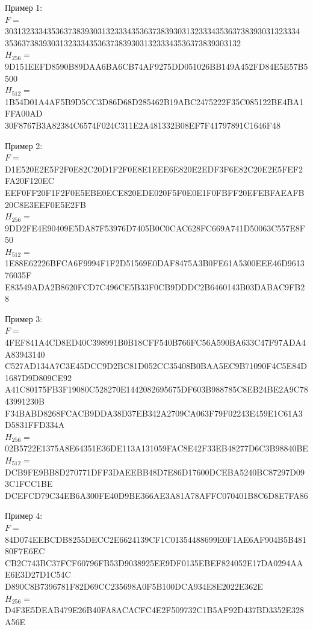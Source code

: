 {\ttfamily
\par
Пример 1:\\
$F=\;$3031323334353637383930313233343536373839303132333435363738393031323334\\35363738393031323334353637383930313233343536373839303132\\
$H_{256}=\;$9D151EEFD8590B89DAA6BA6CB74AF9275DD051026BB149A452FD84E5E57B5500\\
$H_{512}=\;$1B54D01A4AF5B9D5CC3D86D68D285462B19ABC2475222F35C085122BE4BA1FFA00AD\\30F8767B3A82384C6574F024C311E2A481332B08EF7F41797891C1646F48
\par
Пример 2:\\
$F=\;$D1E520E2E5F2F0E82C20D1F2F0E8E1EEE6E820E2EDF3F6E82C20E2E5FEF2FA20F120EC\\EEF0FF20F1F2F0E5EBE0ECE820EDE020F5F0E0E1F0FBFF20EFEBFAEAFB20C8E3EEF0E5E2FB\\
$H_{256}=\;$9DD2FE4E90409E5DA87F53976D7405B0C0CAC628FC669A741D50063C557E8F50\\
$H_{512}=\;$1E88E62226BFCA6F9994F1F2D51569E0DAF8475A3B0FE61A5300EEE46D961376035F\\E83549ADA2B8620FCD7C496CE5B33F0CB9DDDC2B6460143B03DABAC9FB28
\par
Пример 3:\\
$F=\;$4FEF841A4CD8ED40C398991B0B18CFF540B766FC56A590BA633C47F97ADA4A83943140\\C527AD134A7C3E45DCC9D2BC81D052CC35408B0BAA5EC9B71090F4C5E84D1687D9D809CE92\\A41C80175FB3F19080C528270E1442082695675DF603B988785C8EB24BE2A9C7843991230B\\F34BABD8268FCACB9DDA38D37EB342A2709CA063F79F02243E459E1C61A3D5831FFD334A\\
$H_{256}=\;$02B5722E1375A8E64351E36DE113A131059FAC8E42F33EB48277D6C3B98840BE\\
$H_{512}=\;$DCB9FE9BB8D270771DFF3DAEEBB48D7E86D17600DCEBA5240BC87297D093C1FCC1BE\\DCEFCD79C34EB6A300FE40D9BE366AE3A81A78AFFC070401B8C6D8E7FA86
\par
Пример 4:\\
$F=\;$84D074EEBCDB8255DECC2E6624139CF1C01354488699E0F1AE6AF904B5B48180F7E6EC\\CB2C743BC37FCF60796FB53D9038925EE9DF0135EBEF824052E17DA0294AAE6E3D27D1C54C\\D890C8B7396781F82D69CC235698A0F5B100DCA934E8E2022E362E\\
$H_{256}=\;$D4F3E5DEAB479E26B40FA8ACACFC4E2F509732C1B5AF92D437BD3352E328A56E\\
}

